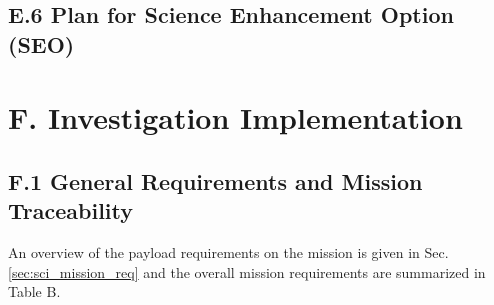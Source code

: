 \documentclass[12pt,journal]{IEEEtran}
\begin{document}
\subsection{E.6	Plan for Science Enhancement Option (SEO)} %


\clearpage
\section{F. Investigation Implementation}
\par{}%

\subsection{F.1 General Requirements and Mission Traceability}

An overview of the payload requirements on the mission is given in Sec. \ref{sec:sci_mission_req} and the overall mission requirements are summarized in Table B. 
\end{document}

